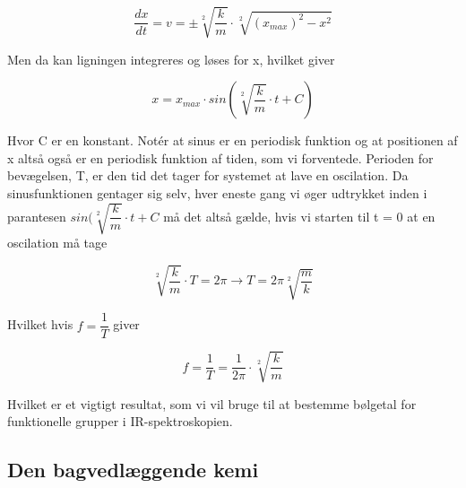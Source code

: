 \documentclass[12pt,a4paper]{article}
\theoremstyle{break}
\theoremstyle{nonumberplain}
\begin{document}
\begin{center}
\begin{equation}
\dfrac{dx}{dt} = v = \pm \sqrt[2]{\dfrac{k}{m}} \cdot \sqrt[2]{(x_{max})^2-x^2}
\end{equation}
\end{center}

Men da kan ligningen integreres og løses for x, hvilket giver

\begin{center}
\begin{equation}
x = x_{max} \cdot sin(\sqrt[2]{\dfrac{k}{m}} \cdot t + C)
\end{equation}
\end{center}
\bigskip
Hvor C er en konstant. Notér at sinus er en periodisk funktion og at positionen af x altså også er en periodisk funktion af tiden, som vi forventede. Perioden for bevægelsen, T, er den tid det tager for systemet at lave en oscilation. Da sinusfunktionen gentager sig selv, hver eneste gang vi øger udtrykket inden i parantesen $sin(\sqrt[2]{\dfrac{k}{m}} \cdot t + C$ må det altså gælde, hvis vi starten til t = 0 at en oscilation må tage

\begin{center}
\begin{equation}
\sqrt[2]{\dfrac{k}{m}} \cdot T = 2 \pi \rightarrow T = 2 \pi \sqrt[2]{\dfrac{m}{k}}
\end{equation}
\end{center}

Hvilket hvis $f = \dfrac{1}{T}$ giver

\begin{center}
\begin{equation}
f = \dfrac{1}{T} = \dfrac{1}{2 \pi} \cdot \sqrt[2]{\dfrac{k}{m}}
\end{equation}
\end{center}

Hvilket er et vigtigt resultat, som vi vil bruge til at bestemme bølgetal for funktionelle grupper i IR-spektroskopien. 
\pagebreak
\subsection{Den bagvedlæggende kemi}
\end{document}
